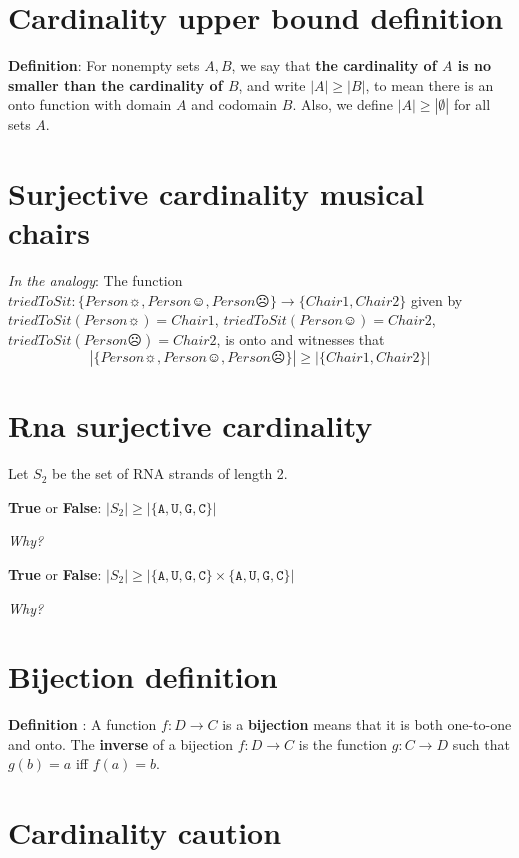 \documentclass[12pt, oneside]{article}
\newcommand{\A}[0]{\texttt{A}}
\newcommand{\C}[0]{\texttt{C}}
\newcommand{\G}[0]{\texttt{G}}
\newcommand{\U}[0]{\texttt{U}}
\begin{document}
\section*{Cardinality upper bound definition}


{\bf Definition}:  For nonempty sets $A, B$, we say that {\bf the  cardinality of $A$ is  no  smaller than 
the cardinality of  $B$}, and 
write $|A| \geq |B|$, to mean there is an onto function  with domain $A$  and codomain $B$.
Also, we define $|A| \geq |\emptyset|$ for all sets $A$.
 \vfill
\section*{Surjective cardinality musical chairs}


{\it In the analogy}: The function $triedToSit: \{ Person\sun, Person\smiley, Person\frownie \} \to  \{ Chair1, Chair2\} $ given
by $triedToSit(Person\sun) = Chair1$,  $triedToSit(Person\smiley) = Chair2$, 
$triedToSit(Person\frownie) = Chair2$, is onto and witnesses that 
\[
 |\{ Person\sun, Person\smiley, Person\frownie \}| \geq | \{ Chair1, Chair2\} |
\] \vfill
\section*{Rna surjective cardinality}


Let $S_2$ be the set of RNA strands of length 2.

{\bf True} or {\bf False}: $ |S_2 | \geq | \{\A,\U,\G,\C\} |$

{\it Why?}
\vspace{80pt}

{\bf True} or {\bf False}: $ |S_2 | \geq | \{\A,\U,\G,\C\} \times \{\A, \U, \G,\C\} |$

{\it Why?}
\vspace{80pt} \vfill
\section*{Bijection definition}


{\bf Definition} : A function $f: D  \to C$ is a {\bf bijection} means that it is both 
one-to-one  and onto. The {\bf inverse} of a  bijection $f: D  \to  C$ is 
the function $g: C  \to  D$  such that $g(b) = a$ iff  $f(a) =  b$.
 \vfill
\section*{Cardinality caution}
\end{document}
